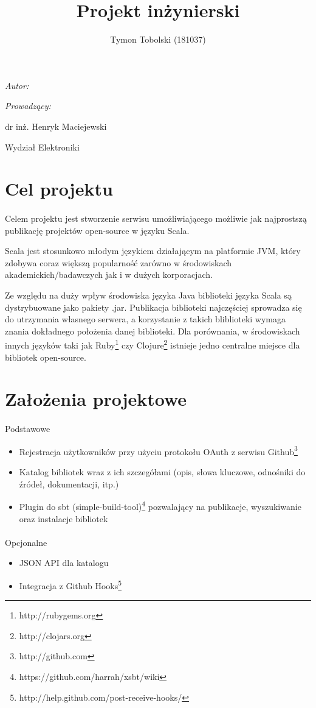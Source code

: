 \documentclass[wide,a4paper,titlepage,12pt] {article}
\title{Projekt inżynierski}
\author{Tymon Tobolski (181037)}
\makeatletter
\renewcommand{\maketitle}{
\begin{titlepage}
  \begin{center}
    \vspace*{3cm}
    \LARGE \@title \par
    \vspace{2cm}
    \textit{\small Autor:}\par
    \normalsize \@author\par \normalsize
    \vspace{3cm}
    \textit{\small Prowadzący:}\par
    dr inż. Henryk Maciejewski \par
    \vspace{2cm}
    Wydział Elektroniki\\ %
  \end{center}
\end{titlepage}
}
\makeatother
\begin{document}
\maketitle
  \section{Cel projektu}
  \paragraph{}
  Celem projektu jest stworzenie serwisu umożliwiającego możliwie
  jak najprostszą publikację projektów open-source w języku Scala.


  Scala jest stosunkowo młodym językiem działającym na platformie JVM,
  który zdobywa coraz większą popularność zarówno w środowiskach
  akademickich/badawczych jak i w dużych korporacjach.

  Ze względu na duży wpływ środowiska języka Java biblioteki języka Scala
  są dystrybuowane jako pakiety .jar. Publikacja biblioteki najczęściej sprowadza
  się do utrzymania własnego serwera, a korzystanie z takich bliblioteki wymaga
  znania dokładnego położenia danej biblioteki. Dla porównania, w środowiskach innych
  języków taki jak Ruby\footnote{http://rubygems.org} czy Clojure\footnote{http://clojars.org} istnieje jedno centralne miejsce dla
  bibliotek open-source.

  \section{Założenia projektowe}
  \paragraph{}
  Podstawowe
  \begin{itemize}
      \item Rejestracja użytkowników przy użyciu protokołu OAuth z serwisu Github\footnote{http://github.com}
      \item Katalog bibliotek wraz z ich szczegółami (opis, słowa kluczowe, odnośniki do źródeł, dokumentacji, itp.)
      \item Plugin do sbt (simple-build-tool)\footnote{https://github.com/harrah/xsbt/wiki} pozwalający na publikacje, wyszukiwanie oraz instalacje bibliotek
  \end{itemize}

  \paragraph{}
  Opcjonalne
  \begin{itemize}
      \item JSON API dla katalogu
      \item Integracja z Github Hooks\footnote{http://help.github.com/post-receive-hooks/}
  \end{itemize}
\end{document}
